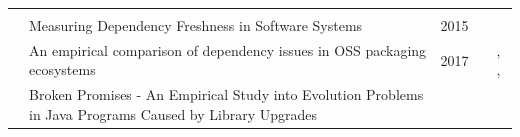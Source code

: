 \documentclass[]{book}
\begin{document}
\begin{longtable}[]{@{}lllll@{}}
\begin{minipage}[t]{0.24\columnwidth}
\strut
\end{minipage} & \begin{minipage}[t]{0.16\columnwidth}\raggedright\strut
\citet{Constantinou2017}\strut
\end{minipage}\tabularnewline
\begin{minipage}[t]{0.12\columnwidth}\raggedright\strut
\citet{Cox2015}\strut
\end{minipage} & \begin{minipage}[t]{0.31\columnwidth}\raggedright\strut
Measuring Dependency Freshness in Software Systems\strut
\end{minipage} & \begin{minipage}[t]{0.02\columnwidth}\raggedright\strut
2015\strut
\end{minipage} & \begin{minipage}[t]{0.24\columnwidth}\raggedright\strut
\strut
\end{minipage} & \begin{minipage}[t]{0.16\columnwidth}\raggedright\strut
\citet{Kikas2017}\strut
\end{minipage}\tabularnewline
\begin{minipage}[t]{0.12\columnwidth}\raggedright\strut
\citet{Decan2017}\strut
\end{minipage} & \begin{minipage}[t]{0.31\columnwidth}\raggedright\strut
An empirical comparison of dependency issues in OSS packaging
ecosystems\strut
\end{minipage} & \begin{minipage}[t]{0.02\columnwidth}\raggedright\strut
2017\strut
\end{minipage} & \begin{minipage}[t]{0.24\columnwidth}\raggedright\strut
\strut
\end{minipage} & \begin{minipage}[t]{0.16\columnwidth}\raggedright\strut
\citet{Abdalkareem2017}, \citet{Constantinou2017},
\citet{Decan2018}\strut
\end{minipage}\tabularnewline
\begin{minipage}[t]{0.12\columnwidth}\raggedright\strut
\citet{Dietrich2014}\strut
\end{minipage} & \begin{minipage}[t]{0.31\columnwidth}\raggedright\strut
Broken Promises - An Empirical Study into Evolution Problems in Java
Programs Caused by Library Upgrades\strut
\end{minipage} & \begin{minipage}[t]{0.02\columnwidth}\raggedright\strut

\end{minipage}
\end{longtable}
\end{document}
